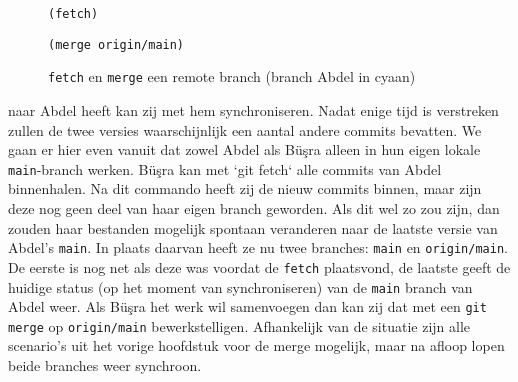 \begin{figure}[ht]
\label{fig:merge}

{ \color{hublue}\tt (fetch) }


{ \color{hublue}\tt (merge\ origin/main) }

\caption{\texttt{fetch} en \texttt{merge} een remote branch (branch Abdel in cyaan)}
\end{figure}

 naar Abdel heeft kan zij met hem synchroniseren. Nadat enige tijd is verstreken zullen de twee versies waarschijnlijk een aantal andere commits bevatten. We gaan er hier even vanuit dat zowel Abdel als B\"u\c sra alleen in hun eigen lokale \texttt{main}-branch werken. B\"u\c sra kan met `git fetch` alle commits van Abdel binnenhalen. Na dit commando heeft zij de nieuw commits binnen, maar zijn deze nog geen deel van haar eigen branch geworden. Als dit wel zo zou zijn, dan zouden haar bestanden mogelijk spontaan veranderen naar de laatste versie van Abdel's \texttt{main}. In plaats daarvan heeft ze nu twee branches: \texttt{main} en \texttt{origin/main}. De eerste is nog net als deze was voordat de \texttt{fetch} plaatsvond, de laatste geeft de huidige status (op het moment van synchroniseren) van de \texttt{main} branch van Abdel weer. Als B\"u\c sra het werk wil samenvoegen dan kan zij dat met een \texttt{git merge} op \texttt{origin/main} bewerkstelligen. Afhankelijk van de situatie zijn alle scenario's uit het vorige hoofdstuk voor de merge mogelijk, maar na afloop lopen beide branches weer synchroon.

